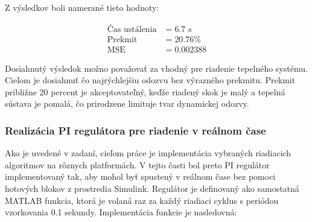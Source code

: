 Z výsledkov boli namerané tieto hodnoty:

\begin{align}
	\text{Čas ustálenia} &= 6.7 \text{ s}
	\label{eq:settling_time} \\
	\text{Prekmit} &= 20.76 \%
	\label{eq:overshoot} \\
	\text{MSE} &= 0.002388
	\label{eq:mse_pi}
\end{align}

Dosiahnutý výsledok možno považovať za vhodný pre riadenie tepelného systému.  
Cieľom je dosiahnuť čo najrýchlejšiu odozvu bez výrazného prekmitu.  
Prekmit približne 20 percent je akceptovateľný, keďže riadený skok je malý a tepelná sústava je pomalá, čo prirodzene limituje tvar dynamickej odozvy.


\subsubsection{Realizácia PI regulátora pre riadenie v reálnom čase}

Ako je uvedené v zadaní, cieľom práce je implementácia vybraných riadiacich algoritmov na rôznych platformách.  
V tejto časti bol preto PI regulátor implementovaný tak, aby mohol byť spustený v reálnom čase bez pomoci hotových blokov z prostredia Simulink.  
Regulátor je definovaný ako samostatná MATLAB funkcia, ktorá je volaná raz za každý riadiaci cyklus s periódou vzorkovania 0.1 sekundy.  
Implementácia funkcie je nasledovná:


